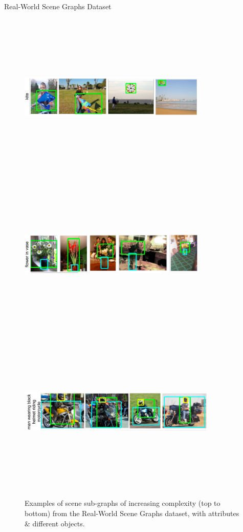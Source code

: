 \documentclass{IFES-beamer}
\begin{document}
        \begin{frame}{Real-World Scene Graphs Dataset}
            \begin{figure}
                \centering
                \includegraphics[width=9cm,height=8cm,keepaspectratio]{Images/scene_1.png}\\
                \includegraphics[width=9cm,height=8cm,keepaspectratio]{Images/scene_2.png}\\
                \includegraphics[width=9.5cm,height=8cm,keepaspectratio]{Images/scene_3.png}
                \caption{\cite{Johnson_2015_CVPR}Examples of scene sub-graphs of increasing complexity (top to bottom) from the Real-World Scene Graphs dataset, with attributes $\&$ different objects.}
                \label{fig:my_label}
            \end{figure}
        \end{frame}
\end{document}
